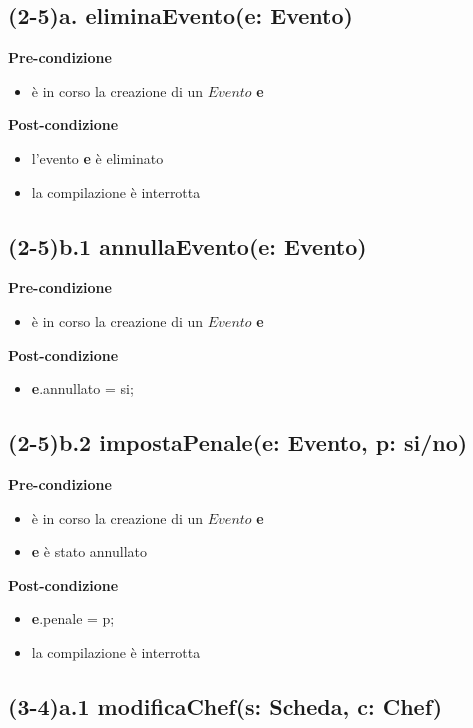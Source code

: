 \documentclass[12pt]{extarticle}
\begin{document}
\subsection*{(2-5)a. eliminaEvento(e: Evento)}

\textbf{Pre-condizione}
\begin{itemize}
  \item è in corso la creazione di un $Evento$ \textbf{e}
\end{itemize}
\textbf{Post-condizione}
\begin{itemize}
  \item l'evento \textbf{e} è eliminato
  \item la compilazione è interrotta
\end{itemize}  


\subsection*{(2-5)b.1 annullaEvento(e: Evento)}

\textbf{Pre-condizione}
\begin{itemize}
  \item è in corso la creazione di un $Evento$ \textbf{e}
\end{itemize}
\textbf{Post-condizione}
\begin{itemize}
  \item \textbf{e}.annullato = si;
\end{itemize}  


\subsection*{(2-5)b.2 impostaPenale(e: Evento, p: si/no)}
\textbf{Pre-condizione}
\begin{itemize}
  \item è in corso la creazione di un $Evento$ \textbf{e}
  \item \textbf{e} è stato annullato
\end{itemize}
\textbf{Post-condizione}
\begin{itemize}
  \item \textbf{e}.penale = p;
  \item la compilazione è interrotta
\end{itemize}  

\subsection*{(3-4)a.1 modificaChef(s: Scheda, c: Chef)}
\end{document}
